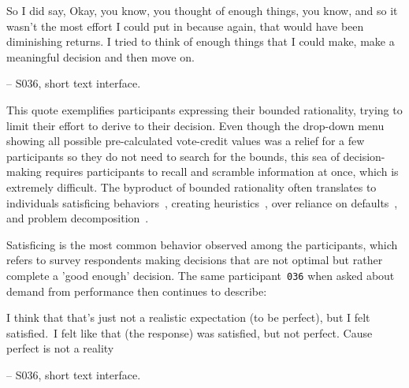 \begin{displayquote}
So I did say, Okay, you know, you thought of enough things, you know, and so it wasn't the most effort I could put in because again, that would have been diminishing returns. I tried to think of enough things that I could make, make a meaningful decision and then move on.

\noindent \hfill -- S036, short text interface.
\end{displayquote}

This quote exemplifies participants expressing their bounded rationality, trying to limit their effort to derive to their decision. Even though the drop-down menu showing all possible pre-calculated vote-credit values was a relief for a few participants so they do not need to search for the bounds, this sea of decision-making requires participants to recall and scramble information at once, which is extremely difficult. The byproduct of bounded rationality often translates to individuals satisficing behaviors~\cite{gigerenzerReasoningFastFrugal1996}, creating heuristics~\cite{tverskyJudgmentUncertaintyHeuristics1974}, over reliance on defaults~\cite{thalerNudgeImprovingDecisions2008a}, and problem decomposition~\cite{simonSciencesArtificial1996}.

Satisficing is the most common behavior observed among the participants, which refers to survey respondents making decisions that are not optimal but rather complete a 'good enough' decision. The same participant~\texttt{036} when asked about demand from performance then continues to describe:

\begin{displayquote}
I think that that's just not a realistic expectation (to be perfect), but I felt satisfied.~\bracketellipsis I felt like that (the response) was satisfied, but not perfect. Cause perfect is not a reality

\noindent \hfill -- S036, short text interface.
\end{displayquote}

